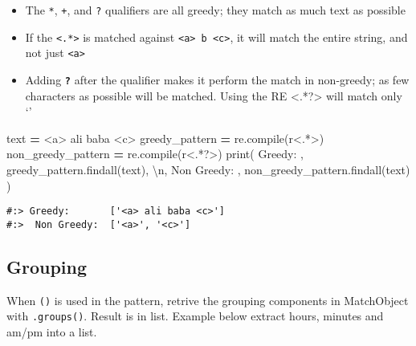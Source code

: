 \documentclass[
]{book}
\newenvironment{Shaded}{\begin{snugshade}}{\end{snugshade}}
\newcommand{\BuiltInTok}[1]{#1}
\newcommand{\CharTok}[1]{\textcolor[rgb]{0.5,0.5,0.5}{#1}}
\newcommand{\NormalTok}[1]{#1}
\newcommand{\OperatorTok}[1]{\textcolor[rgb]{0.43,0.43,0.43}{\textbf{#1}}}
\newcommand{\StringTok}[1]{\textcolor[rgb]{0.5,0.5,0.5}{#1}}
\newcommand{\VerbatimStringTok}[1]{\textcolor[rgb]{0.5,0.5,0.5}{#1}}
\providecommand{\tightlist}{%
  \setlength{\itemsep}{0pt}\setlength{\parskip}{0pt}}
\begin{document}
\begin{itemize}
\tightlist
\item
  The \texttt{*}, \texttt{+}, and \texttt{?} qualifiers are all greedy; they match as much text as possible\\
\item
  If the \texttt{\textless{}.*\textgreater{}} is matched against \texttt{\textless{}a\textgreater{}\ b\ \textless{}c\textgreater{}}, it will match the entire string, and not just \texttt{\textless{}a\textgreater{}}\\
\item
  Adding \textbf{\texttt{?}} after the qualifier makes it perform the match in non-greedy; as few characters as possible will be matched. Using the RE \textless.*?\textgreater{} will match only `'
\end{itemize}

\begin{Shaded}
\begin{Highlighting}[]
\NormalTok{text }\OperatorTok{=} \StringTok{\textquotesingle{}\textless{}a\textgreater{} ali baba \textless{}c\textgreater{}\textquotesingle{}}
\NormalTok{greedy\_pattern     }\OperatorTok{=}\NormalTok{ re.}\BuiltInTok{compile}\NormalTok{(}\VerbatimStringTok{r\textquotesingle{}\textless{}.*\textgreater{}\textquotesingle{}}\NormalTok{)}
\NormalTok{non\_greedy\_pattern }\OperatorTok{=}\NormalTok{ re.}\BuiltInTok{compile}\NormalTok{(}\VerbatimStringTok{r\textquotesingle{}\textless{}.*?\textgreater{}\textquotesingle{}}\NormalTok{)}
\BuiltInTok{print}\NormalTok{( }\StringTok{\textquotesingle{}Greedy:      \textquotesingle{}}\NormalTok{ ,        greedy\_pattern.findall(text), }\StringTok{\textquotesingle{}}\CharTok{\textbackslash{}n}\StringTok{\textquotesingle{}}\NormalTok{,}
       \StringTok{\textquotesingle{}Non Greedy: \textquotesingle{}}\NormalTok{, non\_greedy\_pattern.findall(text) )}
\end{Highlighting}
\end{Shaded}

\begin{verbatim}
#:> Greedy:       ['<a> ali baba <c>'] 
#:>  Non Greedy:  ['<a>', '<c>']
\end{verbatim}

\hypertarget{grouping-1}{%
\subsection{Grouping}\label{grouping-1}}

When \texttt{()} is used in the pattern, retrive the grouping components in MatchObject with \texttt{.groups()}. Result is in list. Example below extract hours, minutes and am/pm into a list.
\end{document}
